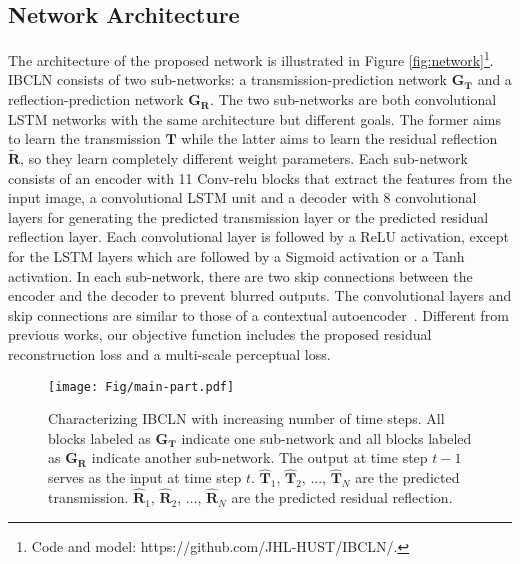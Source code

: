 \documentclass[10pt,twocolumn,letterpaper]{article}
\begin{document}
\subsection{Network Architecture}
The architecture of the proposed network is illustrated in Figure \ref{fig:network}\footnote{Code and model: https://github.com/JHL-HUST/IBCLN/.}. IBCLN consists of two sub-networks: a transmission-prediction network $\bm{G_T}$ and a reflection-prediction network $\bm{G_R}$. The two sub-networks are both convolutional LSTM networks with the same architecture but different goals. The former aims to learn the transmission $\mathbf{T}$ while the latter aims to learn the residual reflection $\mathbf{\widetilde{R}}$, so they learn completely different weight parameters. Each sub-network consists of an encoder with 11 Conv-relu blocks that extract the features from the input image, a convolutional LSTM unit \cite{xingjian2015convolutional} and a decoder with 8 convolutional layers for generating the predicted transmission layer or the predicted residual reflection layer. Each convolutional layer is followed by a ReLU activation, except for the LSTM layers which are followed by a Sigmoid activation or a Tanh activation. In each sub-network, there are two skip connections between the encoder and the decoder to prevent blurred outputs. The convolutional layers and skip connections are similar to those of a contextual autoencoder~\cite{qian2018attentive}. Different from previous works, our objective function includes the proposed residual reconstruction loss and a multi-scale perceptual loss. 

\begin{figure}[htbp]
    \begin{center}
        \texttt{[image: Fig/main-part.pdf]}
    \end{center}
    \vspace{-0.5em}
    \caption{Characterizing IBCLN with increasing number of time steps. All blocks labeled as $\bm{G_T}$ indicate one sub-network and all blocks labeled as $\bm{G_R}$ indicate another sub-network. The output at time step $t-1$ serves as the input at time step $t$.  $\mathbf{\hat{T}}_1$, $\mathbf{\hat{T}}_2$, ..., $\mathbf{\hat{T}}_N$ are the predicted transmission. $\mathbf{\hat{R}}_1$, $\mathbf{\hat{R}}_2$, ..., $\mathbf{\hat{R}}_N$ are the predicted residual reflection.
    }
    \label{fig:main-part}
    \vspace{-0.5em}
\end{figure}
\end{document}
